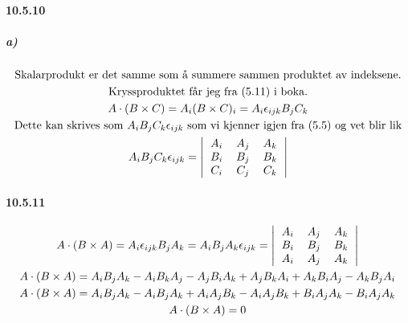 \documentclass[11pt, A4paper,norsk]{article}
\begin{document}
		\paragraph{10.5.10}
			\subparagraph{a)}
				\begin{gather*}
\text{Skalarprodukt er det samme som å summere sammen produktet av indeksene.} \\
\text{Kryssproduktet får jeg fra $(5.11)$ i boka.} \\
A \cdot (B \times C) = A_{i} (B \times C)_{i} = A_{i} \epsilon_{ijk} B_{j} C_{k} \\
\text{Dette kan skrives som $A_{i} B_{j} C_{k} \epsilon_{ijk}$ som vi kjenner igjen fra $(5.5)$ og vet blir lik} \\
A_{i} B_{j} C_{k} \epsilon_{ijk} =
\left| \begin{tabular}{c c c}
$A_{i}$ & $A_{j}$ & $A_{k}$ \\
$B_{i}$ & $B_{j}$ & $B_{k}$ \\
$C_{i}$ & $C_{j}$ & $C_{k}$ 
\end{tabular} \right|
				\end{gather*}









		\paragraph{10.5.11}
			\begin{gather*}
A \cdot (B \times A) = A_i \epsilon_{ijk} B_j A_k = A_i B_j A_k \epsilon_{ijk} =
\left| \begin{tabular}{c c c}
$A_{i}$ & $A_{j}$ & $A_{k}$ \\
$B_{i}$ & $B_{j}$ & $B_{k}$ \\
$A_{i}$ & $A_{j}$ & $A_{k}$ 
\end{tabular} \right| \\
A \cdot (B \times A) = A_i B_j A_k - A_i B_k A_j - A_j B_i A_k + A_j B_k A_i + A_k B_i A_j - A_k B_j A_i \\
A \cdot (B \times A) = A_i B_j A_k - A_i B_j A_k + A_i A_j B_k - A_i A_j B_k + B_i A_j A_k - B_i A_j A_k \\
A \cdot (B \times A) = 0
			\end{gather*}
\end{document}
